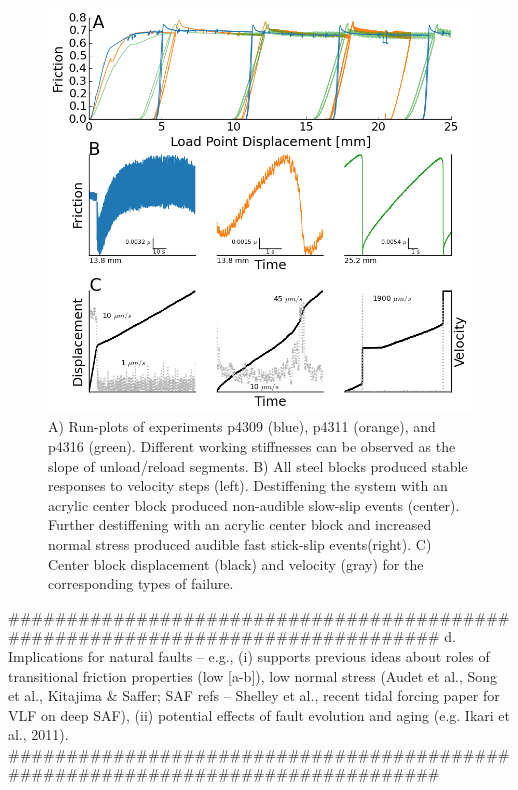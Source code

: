 \documentclass[11pt]{article}
\begin{document}
\begin{figure}
	\centering
		\includegraphics[scale=0.7]{../Figures/Fig_Runplot/runplot.png}
   	\caption{A) Run-plots of experiments p4309 (blue), p4311 (orange), and p4316
   	(green). Different working stiffnesses can be observed as the slope of
   	unload/reload segments. B) All steel blocks produced stable responses to
   	velocity steps (left). Destiffening the system with an acrylic center block
   	produced non-audible slow-slip events (center). Further destiffening with an
   	acrylic center block and increased normal stress produced audible fast
   	stick-slip events(right). C) Center block displacement (black) and velocity
   	(gray) for the corresponding types of failure.}
  	\label{Figure:Runplot}
\end{figure}

################################################################################
d.	Implications for natural faults – e.g., (i) supports previous ideas about
roles of transitional friction properties (low [a-b]), low normal stress (Audet
et al., Song et al., Kitajima & Saffer; SAF refs – Shelley et al., recent tidal
forcing paper for VLF on deep SAF),  (ii) potential effects of fault evolution
and aging (e.g. Ikari et al., 2011).
################################################################################
\end{document}
